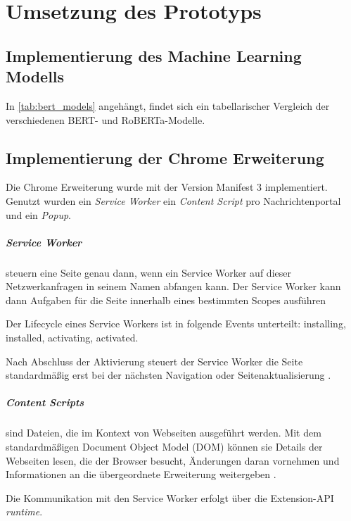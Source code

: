 \chapter{Umsetzung des Prototyps}
\label{chap:umsetzung_des_prototyps}

\section{Implementierung des Machine Learning Modells}

In \ref{tab:bert_models} angehängt, findet sich ein tabellarischer Vergleich der verschiedenen BERT- und RoBERTa-Modelle.


\section{Implementierung der Chrome Erweiterung}

Die Chrome Erweiterung wurde mit der Version Manifest 3 implementiert.
Genutzt wurden ein \textit{Service Worker} ein \textit{Content Script} pro Nachrichtenportal und ein \textit{Popup}.

\paragraph{Service Worker} steuern eine Seite genau dann, wenn ein Service Worker auf dieser Netzwerkanfragen in seinem Namen abfangen kann. 
Der Service Worker kann dann Aufgaben für die Seite innerhalb eines bestimmten Scopes ausführen

Der Lifecycle eines Service Workers ist in folgende Events unterteilt: installing, installed, activating, activated.

Nach Abschluss der Aktivierung steuert der Service Worker die Seite standardmäßig erst 
bei der nächsten Navigation oder Seitenaktualisierung \cite{chrome2025serviceworker}.

\paragraph{Content Scripts} sind Dateien, die im Kontext von Webseiten ausgeführt werden. 
Mit dem standardmäßigen Document Object Model (DOM) können sie Details der Webseiten lesen, die der Browser besucht, 
Änderungen daran vornehmen und Informationen an die übergeordnete Erweiterung weitergeben \cite{chrome2025contentscripts}.

Die Kommunikation mit den Service Worker erfolgt über die Extension-API \textit{runtime}.

